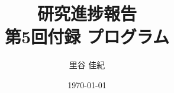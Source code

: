 \documentclass{jarticle}
\title{研究進捗報告 \\ 第5回付録 プログラム}
\author{里谷 佳紀}
\date{\today}
\begin{document}
\maketitle
\inputminted[linenos,fontsize=\small]
            {python}{test-distance-update.py}
\end{document}
